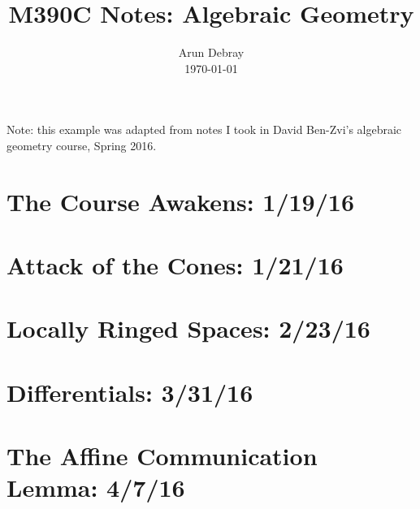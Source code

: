 \documentclass{../../minnotes_d}
\begin{document}
\title{M390C Notes: Algebraic Geometry}
\author{Arun Debray\\\today}
\maketitle

{\small
Note: this example was adapted from notes I took in David Ben-Zvi's algebraic geometry course, Spring 2016.
}

\tableofcontents

\section{The Course Awakens: 1/19/16}
	
\section{Attack of the Cones: 1/21/16}
	
\section{Locally Ringed Spaces: 2/23/16}
	
\section{Differentials: 3/31/16}
	
\section{The Affine Communication Lemma: 4/7/16}
	
\end{document}
